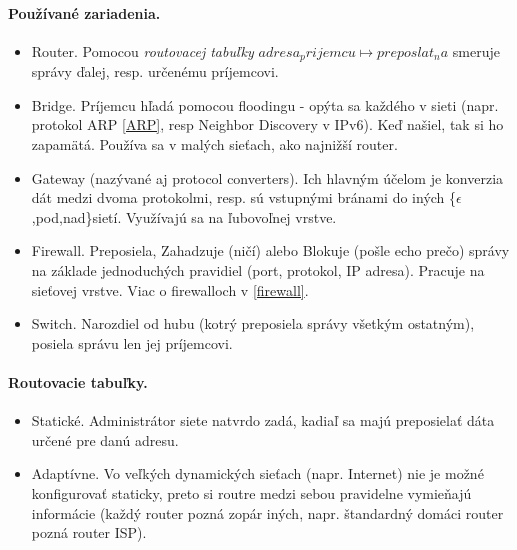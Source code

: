 \documentclass[10pt,a4paper]{article}
\begin{document}
\paragraph{Používané zariadenia.}
\begin{itemize}
\item Router. Pomocou \emph{routovacej tabuľky} $adresa_prijemcu \mapsto preposlat_na$ smeruje správy ďalej, resp. určenému príjemcovi.         
\item Bridge. Príjemcu hľadá pomocou floodingu - opýta sa každého v sieti (napr. protokol ARP \ref{ARP}, resp Neighbor Discovery v IPv6). Keď našiel, tak si ho zapamätá. Používa sa v malých sieťach, ako najnižší router.  
\item Gateway (nazývané aj protocol converters). Ich hlavným účelom je konverzia dát medzi dvoma protokolmi, resp. sú vstupnými bránami do iných \{$\epsilon$,pod,nad\}sietí. Využívajú sa na ľubovoľnej vrstve. 
\item Firewall. Preposiela, Zahadzuje (ničí) alebo Blokuje (pošle echo prečo) správy na základe jednoduchých pravidiel (port, protokol, IP adresa). Pracuje na sieťovej vrstve. Viac o firewalloch v \ref{firewall}. 
\item Switch. Narozdiel od hubu (kotrý preposiela správy všetkým ostatným), posiela správu len jej príjemcovi. 
\end{itemize}  

\label{routing_tables}
\paragraph{Routovacie tabuľky.} 
\begin{itemize}
\item Statické. Administrátor siete natvrdo zadá, kadiaľ sa majú preposielať dáta určené pre danú adresu.           
\item Adaptívne. Vo veľkých dynamických sieťach (napr. Internet) nie je možné konfigurovať staticky, preto si routre medzi sebou pravidelne vymieňajú informácie (každý router pozná zopár iných, napr. štandardný domáci router pozná router ISP). 
\end{itemize} 
\end{document}
